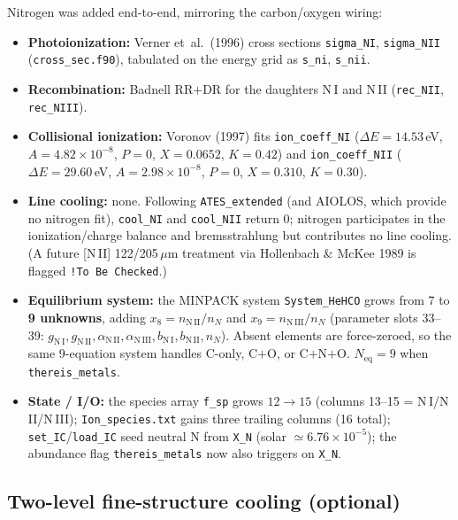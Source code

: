 \documentclass[english,a4paper]{my_memo}
\begin{document}
Nitrogen was added end-to-end, mirroring the carbon/oxygen wiring:
\begin{itemize}
  \item \textbf{Photoionization:} Verner et~al.~(1996) cross sections
    \texttt{sigma\_NI}, \texttt{sigma\_NII} (\texttt{cross\_sec.f90}),
    tabulated on the energy grid as \texttt{s\_ni}, \texttt{s\_nii}.
  \item \textbf{Recombination:} Badnell RR$+$DR for the daughters N\,I
    and N\,II (\texttt{rec\_NII}, \texttt{rec\_NIII}).
  \item \textbf{Collisional ionization:} Voronov (1997) fits
    \texttt{ion\_coeff\_NI} (\(\Delta E=14.53\)\,eV, \(A=4.82\times
    10^{-8}\), \(P=0\), \(X=0.0652\), \(K=0.42\)) and
    \texttt{ion\_coeff\_NII} (\(\Delta E=29.60\)\,eV, \(A=2.98\times
    10^{-8}\), \(P=0\), \(X=0.310\), \(K=0.30\)).
  \item \textbf{Line cooling:} none.  Following \texttt{ATES\_extended}
    (and AIOLOS, which provide no nitrogen fit), \texttt{cool\_NI} and
    \texttt{cool\_NII} return \(0\); nitrogen participates in the
    ionization/charge balance and bremsstrahlung but contributes no
    line cooling.  (A future [N\,II] 122/205\,\(\mu\)m treatment via
    Hollenbach \& McKee 1989 is flagged \texttt{!To Be Checked}.)
  \item \textbf{Equilibrium system:} the MINPACK system
    \texttt{System\_HeHCO} grows from 7 to \textbf{9 unknowns}, adding
    \(x_8 = n_{\mathrm{N\,II}}/n_N\) and \(x_9 = n_{\mathrm{N\,III}}/n_N\)
    (parameter slots 33--39: \(g_{\mathrm{N\,I}}, g_{\mathrm{N\,II}},
    \alpha_{\mathrm{N\,II}}, \alpha_{\mathrm{N\,III}},
    b_{\mathrm{N\,I}}, b_{\mathrm{N\,II}}, n_N\)).  Absent elements are
    force-zeroed, so the same 9-equation system handles C-only, C$+$O,
    or C$+$N$+$O.  \(N_\mathrm{eq}=9\) when \texttt{thereis\_metals}.
  \item \textbf{State / I/O:} the species array \texttt{f\_sp} grows
    \(12\rightarrow15\) (columns 13--15 = N\,I/N\,II/N\,III);
    \texttt{Ion\_species.txt} gains three trailing columns (16 total);
    \texttt{set\_IC}/\texttt{load\_IC} seed neutral N from \texttt{X\_N}
    (solar \(\simeq 6.76\times10^{-5}\)); the abundance flag
    \texttt{thereis\_metals} now also triggers on \texttt{X\_N}.
\end{itemize}

\subsection{Two-level fine-structure cooling (optional)}
\end{document}
